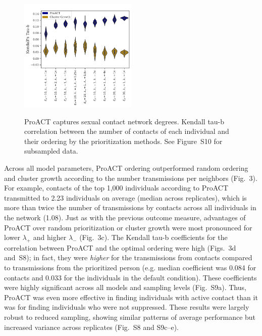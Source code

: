 \documentclass[a4paper,11pt]{article}
\begin{document}
\begin{figure}[!tp]
\centering
{\footnotesize
\includegraphics[width=0.5\textwidth]{figs/Fig4.pdf}%
\\
}
\caption{ProACT captures sexual contact network degrees.
 Kendall tau-b correlation between the number of contacts of each individual and their ordering by the prioritization methods.
 See Figure~S10 for subsampled data. 
 }
\label{fig:efficacy-conc}
\end{figure}

Across all model parameters, ProACT ordering outperformed random ordering and cluster growth according to the number transmissions per neighbors (Fig.~3).
For example, contacts of the top 1,000 individuals according to ProACT transmitted to 2.23 individuals on average (median across replicates), which is more than twice the number of transmissions by contacts across all individuals in the network (1.08).
Just as with the previous outcome measure, advantages of ProACT over random prioritization or cluster growth were most pronounced for lower $\lambda_{+}$ and higher $\lambda_{-}$ (Fig.~3c). 
The Kendall tau-b coefficients for the correlation between ProACT and the optimal ordering were high (Figs.~3d and~S8); in fact, they were \textit{higher} for the transmissions from contacts compared to transmissions from the prioritized person (e.g. median coefficient was 0.084 for contacts and 0.033 for the individuals in the default condition). 
These coefficients were highly significant across all models and sampling levels (Fig.~S9a).
Thus, ProACT was even more effective in finding individuals with active contact than it was for finding individuals who were not suppressed. 
These results were largely robust to reduced sampling, showing similar patterns of average performance but increased variance across replicates (Fig.~S8 and S9c--e).
\end{document}
